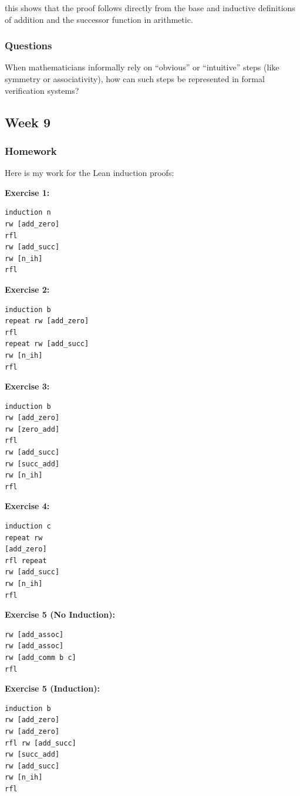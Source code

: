 \documentclass{article}
\theoremstyle{theorem}
\theoremstyle{definition}
\theoremstyle{remark}
\begin{document}
this shows that the proof follows directly from the base and inductive definitions of addition and the successor function in arithmetic.

\subsubsection{Questions}

When mathematicians informally rely on “obvious” or “intuitive” steps (like symmetry or associativity), 
how can such steps be represented in formal verification systems?  


\subsection{Week 9}

\subsubsection{Homework}

Here is my work for the Lean induction proofs:

\textbf{Exercise 1:}
\begin{lstlisting}
induction n
rw [add_zero]
rfl
rw [add_succ]
rw [n_ih]
rfl
\end{lstlisting}

\textbf{Exercise 2:}
\begin{lstlisting}
induction b
repeat rw [add_zero]
rfl
repeat rw [add_succ]
rw [n_ih]
rfl
\end{lstlisting}

\textbf{Exercise 3:}
\begin{lstlisting}
induction b
rw [add_zero]
rw [zero_add]
rfl
rw [add_succ] 
rw [succ_add] 
rw [n_ih] 
rfl
\end{lstlisting}

\textbf{Exercise 4:}
\begin{lstlisting}
induction c 
repeat rw 
[add_zero] 
rfl repeat 
rw [add_succ] 
rw [n_ih] 
rfl
\end{lstlisting}

\textbf{Exercise 5 (No Induction):}
\begin{lstlisting}
rw [add_assoc] 
rw [add_assoc] 
rw [add_comm b c] 
rfl
\end{lstlisting}

\textbf{Exercise 5 (Induction):}
\begin{lstlisting}
induction b 
rw [add_zero] 
rw [add_zero] 
rfl rw [add_succ] 
rw [succ_add] 
rw [add_succ]
rw [n_ih] 
rfl
\end{lstlisting}
\end{document}
